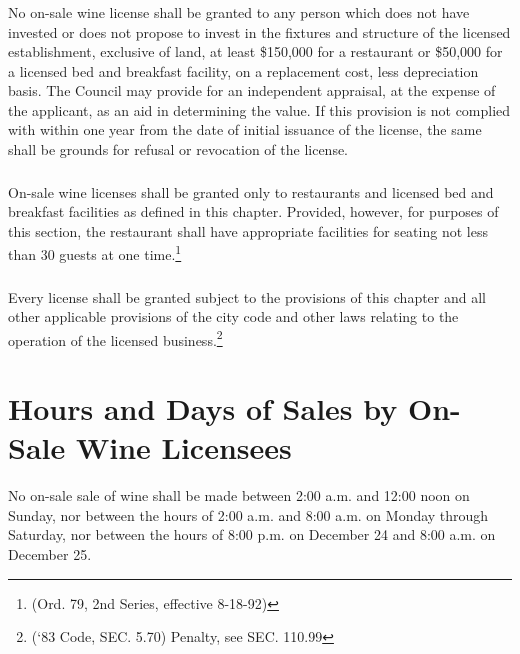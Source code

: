 \subsubsection{}
No on-sale wine license shall be granted to any person which does not have invested or does not propose to invest in the fixtures and structure of the licensed establishment, exclusive of land, at least \$150,000 for a restaurant or \$50,000 for a licensed bed and breakfast facility, on a replacement cost, less depreciation basis.  The Council may provide for an independent appraisal, at the expense of the applicant, as an aid in determining the value.  If this provision is not complied with within one year from the date of initial issuance of the license, the same shall be grounds for refusal or revocation of the license.
\subsubsection{}
On-sale wine licenses shall be granted only to restaurants and licensed bed and breakfast facilities as defined in this chapter.  Provided, however, for purposes of this section, the restaurant shall have appropriate facilities for seating not less than 30 guests at one time.\footnote{(Ord. 79, 2nd Series, effective 8-18-92)}
\subsubsection{}
Every license shall be granted subject to the provisions of this chapter and all other applicable provisions of the city code and other laws relating to the operation of the licensed business.\footnote{(‘83 Code, SEC. 5.70)  Penalty, see SEC. 110.99}

\section{Hours and Days of Sales by On-Sale Wine Licensees}
No on-sale sale of wine shall be made between 2:00 a.m. and 12:00 noon on Sunday, nor between the hours of 2:00 a.m. and 8:00 a.m. on Monday through Saturday, nor between the hours of 8:00 p.m. on December 24 and 8:00 a.m. on December 25.

